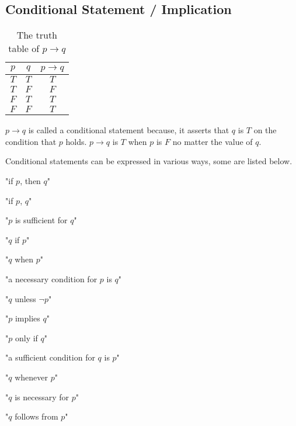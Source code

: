 \documentclass[12pt letter]{report}
\begin{document}
\subsection{Conditional Statement / Implication}


\begin{table}[h!]
	\caption{The truth table of $p \to  q$}\label{tab:5}
	\begin{center}
		\begin{tabular}{|c c|c|}
			\hline
			$p$ & $q$ & $p \to q$ \\[0.5ex]
			\hline
			\hline
			$T$ & $T$ & $T$       \\
			$T$ & $F$ & $F$       \\
			$F$ & $T$ & $T$       \\
			$F$ & $F$ & $T$       \\
			\hline
		\end{tabular}
	\end{center}
\end{table}

$p \to q$ is called a conditional statement because, it asserts that $q$ is $T$ on the condition that $p$ holds.
$p \to q$ is $T$ when $p$ is $F$ no matter the value of $q$.

Conditional statements can be expressed in various ways, some are listed below.

"if $p$, then $q$"

"if $p$, $q$"

"$p$ is sufficient for $q$"

"$q$ if $p$"

"$q$ when $p$"

"a necessary condition for $p$ is $q$"

"$q$ unless $\neg p$"


"$p$ implies $q$"

"$p$ only if $q$"

"a sufficient condition for $q$ is $p$"

"$q$ whenever $p$"

"$q$ is necessary for $p$"

"$q$ follows from $p$"
\end{document}
